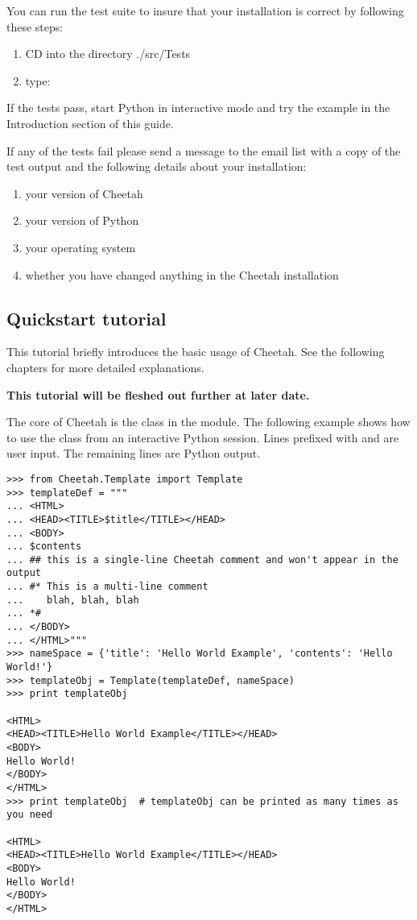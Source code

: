 You can run the test suite to insure that your installation is correct by
following these steps:
\begin{enumerate}
\item CD into the directory ./src/Tests   
\item type:  
\end{enumerate}

If the tests pass, start Python in interactive mode and try the example in the
Introduction section of this guide.

If any of the tests fail please send a message to the email list with a copy of
the test output and the following details about your installation:

\begin{enumerate}
\item your version of Cheetah
\item your version of Python
\item your operating system
\item whether you have changed anything in the Cheetah installation
\end{enumerate}

\subsection{Quickstart tutorial}
\label{gettingStarted.tutorial}

This tutorial briefly introduces the basic usage of Cheetah.  See the
following chapters for more detailed explanations.  

{\bf This tutorial will be fleshed out further at later date.} 

The core of Cheetah is the  class in the 
module. The following example shows how to use the  class from an
interactive Python session. Lines prefixed with \code{>>>} and  are
user input.  The remaining lines are Python output.

\begin{verbatim}
>>> from Cheetah.Template import Template
>>> templateDef = """
... <HTML>
... <HEAD><TITLE>$title</TITLE></HEAD>
... <BODY>
... $contents
... ## this is a single-line Cheetah comment and won't appear in the output
... #* This is a multi-line comment
...    blah, blah, blah 
... *#
... </BODY>
... </HTML>"""
>>> nameSpace = {'title': 'Hello World Example', 'contents': 'Hello World!'}
>>> templateObj = Template(templateDef, nameSpace)
>>> print templateObj
 
<HTML>
<HEAD><TITLE>Hello World Example</TITLE></HEAD>
<BODY>
Hello World!
</BODY>
</HTML>
>>> print templateObj  # templateObj can be printed as many times as you need
 
<HTML>
<HEAD><TITLE>Hello World Example</TITLE></HEAD>
<BODY>
Hello World!
</BODY>
</HTML>

\end{verbatim}




